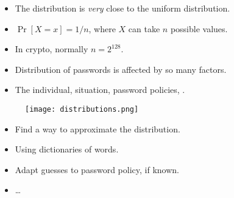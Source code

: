 \begin{frame}
  \begin{example}
    \begin{itemize}
      \item The distribution is \emph{very} close to the uniform distribution.
      \item \Ie \(\Pr[X = x] = 1/n\), where \(X\) can take \(n\) possible 
        values.
      \item In crypto, normally \(n = 2^{128}\).
    \end{itemize}
  \end{example}

  \pause

  \begin{example}[Password]
    \begin{itemize}
      \item Distribution of passwords is affected by so many factors.
      \item The individual, situation, password policies, \etc.
    \end{itemize}
  \end{example}
\end{frame}

\begin{frame}
  \begin{figure}
    \texttt{[image: distributions.png]}
  \end{figure}
\end{frame}

\begin{frame}
  \begin{idea}
    \begin{itemize}
      \item Find a way to approximate the distribution.
    \end{itemize}
  \end{idea}

  \begin{example}
    \begin{itemize}
      \item Using dictionaries of words.
      \item Adapt guesses to password policy, if known.
      \item \dots
    \end{itemize}
  \end{example}
\end{frame}

